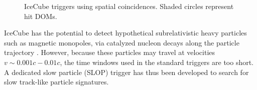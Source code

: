 \begin{figure}[ht]
  \centering
  \quad
  \caption{IceCube triggers using spatial coincidences.  Shaded circles represent hit DOMs.}
\end{figure}

IceCube has the potential to detect hypothetical subrelativistic heavy
particles such as magnetic monopoles, via catalyzed nucleon decays along
the particle trajectory \cite{IC3:monopole}.  However, because these
particles may travel at velocities $v \sim 0.001c - 0.01c$, the
time windows used in the standard triggers are too short.  A
dedicated slow particle (SLOP) trigger has thus been developed to 
search for slow track-like particle signatures.

